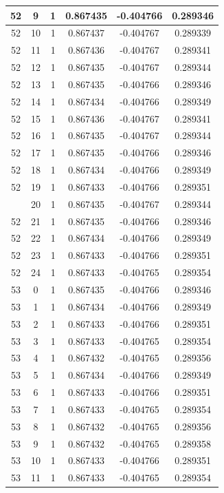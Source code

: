 \documentclass[12pt,a4paper]{article}
\numberwithin{equation}{section}
\numberwithin{figure}{section}
\numberwithin{table}{section}
\begin{document}
\begin{longtable}{|c|c|c|c|c|c|}
52 & 9 & 1 & 0.867435 & -0.404766 & 0.289346 \\ \hline
52 & 10 & 1 & 0.867437 & -0.404767 & 0.289339 \\ \hline
52 & 11 & 1 & 0.867436 & -0.404767 & 0.289341 \\ \hline
52 & 12 & 1 & 0.867435 & -0.404767 & 0.289344 \\ \hline
52 & 13 & 1 & 0.867435 & -0.404766 & 0.289346 \\ \hline
52 & 14 & 1 & 0.867434 & -0.404766 & 0.289349 \\ \hline
52 & 15 & 1 & 0.867436 & -0.404767 & 0.289341 \\ \hline
52 & 16 & 1 & 0.867435 & -0.404767 & 0.289344 \\ \hline
52 & 17 & 1 & 0.867435 & -0.404766 & 0.289346 \\ \hline
52 & 18 & 1 & 0.867434 & -0.404766 & 0.289349 \\ \hline
52 & 19 & 1 & 0.867433 & -0.404766 & 0.289351 \\ \hline
\pagebreak
52 & 20 & 1 & 0.867435 & -0.404767 & 0.289344 \\ \hline
52 & 21 & 1 & 0.867435 & -0.404766 & 0.289346 \\ \hline
52 & 22 & 1 & 0.867434 & -0.404766 & 0.289349 \\ \hline
52 & 23 & 1 & 0.867433 & -0.404766 & 0.289351 \\ \hline
52 & 24 & 1 & 0.867433 & -0.404765 & 0.289354 \\ \hline
53 & 0 & 1 & 0.867435 & -0.404766 & 0.289346 \\ \hline
53 & 1 & 1 & 0.867434 & -0.404766 & 0.289349 \\ \hline
53 & 2 & 1 & 0.867433 & -0.404766 & 0.289351 \\ \hline
53 & 3 & 1 & 0.867433 & -0.404765 & 0.289354 \\ \hline
53 & 4 & 1 & 0.867432 & -0.404765 & 0.289356 \\ \hline
53 & 5 & 1 & 0.867434 & -0.404766 & 0.289349 \\ \hline
53 & 6 & 1 & 0.867433 & -0.404766 & 0.289351 \\ \hline
53 & 7 & 1 & 0.867433 & -0.404765 & 0.289354 \\ \hline
53 & 8 & 1 & 0.867432 & -0.404765 & 0.289356 \\ \hline
53 & 9 & 1 & 0.867432 & -0.404765 & 0.289358 \\ \hline
53 & 10 & 1 & 0.867433 & -0.404766 & 0.289351 \\ \hline
53 & 11 & 1 & 0.867433 & -0.404765 & 0.289354 \\ \hline

\end{longtable}
\end{document}
